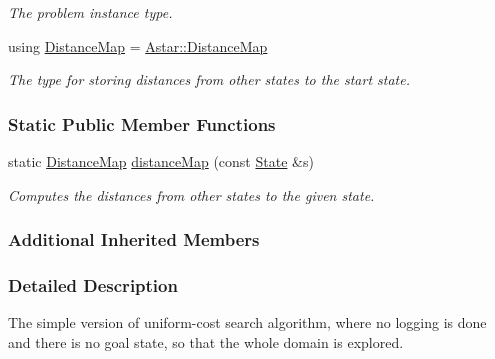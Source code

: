\begin{DoxyCompactItemize}
\begin{DoxyCompactList}\small\item\em The problem instance type. \end{DoxyCompactList}\item 
using \hyperlink{structslb_1_1ext_1_1algorithm_1_1SimpleUniformCost_ad8ab6f10bc2a9200e63072d091fa626d}{Distance\+Map} = \hyperlink{structslb_1_1ext_1_1algorithm_1_1Astar_a210d1f8bc1c2e97e626deb1051de2b2b}{Astar\+::\+Distance\+Map}\hypertarget{structslb_1_1ext_1_1algorithm_1_1SimpleUniformCost_ad8ab6f10bc2a9200e63072d091fa626d}{}\label{structslb_1_1ext_1_1algorithm_1_1SimpleUniformCost_ad8ab6f10bc2a9200e63072d091fa626d}

\begin{DoxyCompactList}\small\item\em The type for storing distances from other states to the start state. \end{DoxyCompactList}\end{DoxyCompactItemize}
\subsubsection*{Static Public Member Functions}
\begin{DoxyCompactItemize}
\item 
static \hyperlink{structslb_1_1ext_1_1algorithm_1_1SimpleUniformCost_ad8ab6f10bc2a9200e63072d091fa626d}{Distance\+Map} \hyperlink{structslb_1_1ext_1_1algorithm_1_1SimpleUniformCost_a4de62ce05e2f99975ee08f7e56dd177c}{distance\+Map} (const \hyperlink{structslb_1_1ext_1_1algorithm_1_1SimpleUniformCost_ab7ba38c5015e84272df2f291b18a5b6a}{State} \&s)
\begin{DoxyCompactList}\small\item\em Computes the distances from other states to the given state. \end{DoxyCompactList}\end{DoxyCompactItemize}
\subsubsection*{Additional Inherited Members}


\subsubsection{Detailed Description}
The simple version of uniform-\/cost search algorithm, where no logging is done and there is no goal state, so that the whole domain is explored. 

